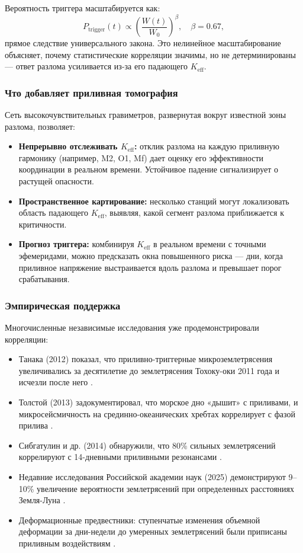 \documentclass[12pt,a4paper]{article}
\theoremstyle{remark}
\begin{document}
	Вероятность триггера масштабируется как:
	\[
	P_{\text{trigger}}(t) \propto \left( \frac{W(t)}{W_0} \right)^{\beta}, \quad \beta = 0.67,
	\]
	прямое следствие универсального закона. Это нелинейное масштабирование объясняет, почему статистические корреляции значимы, но не детерминированы — ответ разлома усиливается из-за его падающего \(K_{\mathrm{eff}}\).
	
	\subsubsection{Что добавляет приливная томография}
	
	Сеть высокочувствительных гравиметров, развернутая вокруг известной зоны разлома, позволяет:
	
	\begin{itemize}
		\item \textbf{Непрерывно отслеживать \(K_{\mathrm{eff}}\):} отклик разлома на каждую приливную гармонику (например, M2, O1, Mf) дает оценку его эффективности координации в реальном времени. Устойчивое падение сигнализирует о растущей опасности.
		\item \textbf{Пространственное картирование:} несколько станций могут локализовать область падающего \(K_{\mathrm{eff}}\), выявляя, какой сегмент разлома приближается к критичности.
		\item \textbf{Прогноз триггера:} комбинируя \(K_{\mathrm{eff}}\) в реальном времени с точными эфемеридами, можно предсказать окна повышенного риска — дни, когда приливное напряжение выстраивается вдоль разлома и превышает порог срабатывания.
	\end{itemize}
	
	\subsubsection{Эмпирическая поддержка}
	
	Многочисленные независимые исследования уже продемонстрировали корреляции:
	
	\begin{itemize}
		\item Танака (2012) показал, что приливно-триггерные микроземлетрясения увеличивались за десятилетие до землетрясения Тохоку-оки 2011 года и исчезли после него \cite{Tanaka2012}.
		\item Толстой (2013) задокументировал, что морское дно «дышит» с приливами, и микросейсмичность на срединно-океанических хребтах коррелирует с фазой прилива \cite{Tolstoy2013}.
		\item Сибгатулин и др. (2014) обнаружили, что 80\% сильных землетрясений коррелируют с 14-дневными приливными резонансами \cite{Sibgatulin2014}.
		\item Недавние исследования Российской академии наук (2025) демонстрируют 9–10\% увеличение вероятности землетрясений при определенных расстояниях Земля-Луна \cite{RAN2025}.
		\item Деформационные предвестники: ступенчатые изменения объемной деформации за дни-недели до умеренных землетрясений были приписаны приливным воздействиям \cite{DeformationPrecursors2024}.
	\end{itemize}
	
\end{document}
